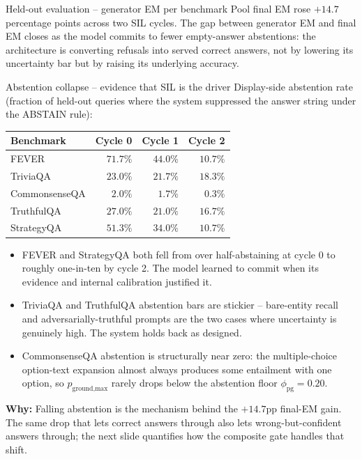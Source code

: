 \documentclass[10pt,aspectratio=169]{beamer}
\newcommand{\why}[1]{{\color{caemamber}\textbf{Why:}} #1}
\begin{document}
\begin{frame}{Held-out evaluation -- generator EM per benchmark}
  \vspace{0.3em}
  {\scriptsize Pool final EM rose $+14.7$ percentage points across two SIL cycles. The gap between generator EM and final EM closes as the model commits to fewer empty-answer abstentions: the architecture is converting refusals into served correct answers, not by lowering its uncertainty bar but by raising its underlying accuracy.}
\end{frame}

\begin{frame}{Abstention collapse -- evidence that SIL is the driver}
  \scriptsize
  Display-side abstention rate (fraction of held-out queries where the system suppressed the answer string under the ABSTAIN rule):

  \vspace{0.3em}
  \begin{tabular}{@{}lrrr@{}}
    \toprule
    \textbf{Benchmark} & \textbf{Cycle 0} & \textbf{Cycle 1} & \textbf{Cycle 2} \\
    \midrule
    FEVER         & $71.7\%$ & $44.0\%$ & $\mathbf{10.7\%}$ \\
    TriviaQA      & $23.0\%$ & $21.7\%$ & $18.3\%$ \\
    CommonsenseQA & $2.0\%$  & $1.7\%$  & $0.3\%$ \\
    TruthfulQA    & $27.0\%$ & $21.0\%$ & $16.7\%$ \\
    StrategyQA    & $51.3\%$ & $34.0\%$ & $\mathbf{10.7\%}$ \\
    \bottomrule
  \end{tabular}

  \vspace{0.4em}
  \begin{itemize}\scriptsize
    \item FEVER and StrategyQA both fell from over half-abstaining at cycle 0 to roughly one-in-ten by cycle 2. The model learned to commit when its evidence and internal calibration justified it.
    \item TriviaQA and TruthfulQA abstention bars are stickier -- bare-entity recall and adversarially-truthful prompts are the two cases where uncertainty is genuinely high. The system holds back as designed.
    \item CommonsenseQA abstention is structurally near zero: the multiple-choice option-text expansion almost always produces some entailment with one option, so $p_{\text{ground,max}}$ rarely drops below the abstention floor $\phi_{\text{pg}}=0.20$.
  \end{itemize}

  \why{Falling abstention is the mechanism behind the $+14.7$pp final-EM gain. The same drop that lets correct answers through also lets wrong-but-confident answers through; the next slide quantifies how the composite gate handles that shift.}
\end{frame}
\end{document}
